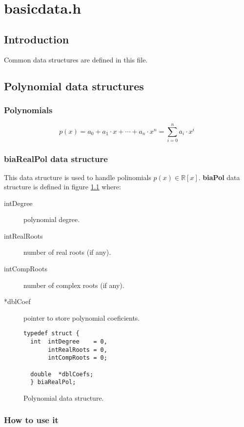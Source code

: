 %
%

\chapter{basicdata.h}

\section{Introduction}

Common data structures are defined in this file.

\section{Polynomial data structures}

\subsection{Polynomials}

\begin{equation}
p(x) = a_0 + a_1 \cdot x + \cdots + a_n \cdot x^n = \sum_{i=0}^n a_i \cdot x^i
\end{equation}

\subsection{biaRealPol data structure} \label{sec:biaRealPol}

This data structure is used to handle polinomials $p(x) \in \mathbb{R}[x]$. \textbf{biaPol} data structure is defined in figure \ref{fig:biaRealPol} where:

\begin{description}
\item[intDegree] polynomial degree.
\item[intRealRoots] number of real roots (if any).
\item[intCompRoots] number of complex roots (if any).
\item[*dblCoef] pointer to store polynomial coeficients.
\end{description}

\begin{figure}[!h]
\begin{verbatim}
typedef struct {
  int  intDegree    = 0,
       intRealRoots = 0,
       intCompRoots = 0;

  double  *dblCoefs;
  } biaRealPol;
\end{verbatim}
\caption{Polynomial data structure.} \label{fig:biaRealPol}
\end{figure}

\subsection{How to use it}
